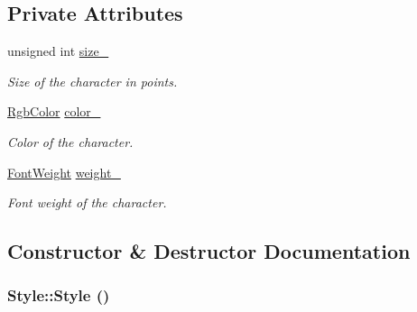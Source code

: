 \subsection*{Private Attributes}
\begin{CompactItemize}
\item 
\hypertarget{class_style_25ff6a0bb75d86d204711507f8d8865e}{
unsigned int \hyperlink{class_style_25ff6a0bb75d86d204711507f8d8865e}{size\_\-}}
\label{class_style_25ff6a0bb75d86d204711507f8d8865e}

\begin{CompactList}\small\item\em Size of the character in points. \item\end{CompactList}\item 
\hypertarget{class_style_cfd308751180d820aac54f5d96951f34}{
\hyperlink{struct_rgb_color}{RgbColor} \hyperlink{class_style_cfd308751180d820aac54f5d96951f34}{color\_\-}}
\label{class_style_cfd308751180d820aac54f5d96951f34}

\begin{CompactList}\small\item\em Color of the character. \item\end{CompactList}\item 
\hypertarget{class_style_82e4a1ebf54db6abc6fa3e23706a6aa8}{
\hyperlink{_font_weight_8h_ecff23ba4a68486421bcea57e095fe66}{FontWeight} \hyperlink{class_style_82e4a1ebf54db6abc6fa3e23706a6aa8}{weight\_\-}}
\label{class_style_82e4a1ebf54db6abc6fa3e23706a6aa8}

\begin{CompactList}\small\item\em Font weight of the character. \item\end{CompactList}\end{CompactItemize}


\subsection{Constructor \& Destructor Documentation}
\hypertarget{class_style_914f187818eb30c0cebe3df5378bfa0a}{
\subsubsection[Style]{\setlength{\rightskip}{0pt plus 5cm}Style::Style ()}}
\label{class_style_914f187818eb30c0cebe3df5378bfa0a}



